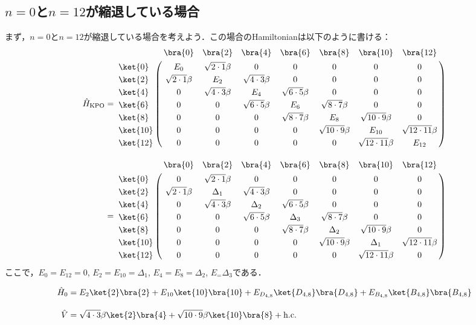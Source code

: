 \subsection{$n=0$と$n=12$が縮退している場合}
まず，$n=0$と$n=12$が縮退している場合を考えよう．この場合のHamiltonianは以下のように書ける：
\begin{align}
     \hat{H}_{\rm{KPO}}&=
   \bordermatrix{     
    & \bra{0} &  \bra{2} &  \bra{4}&  \bra{6}&  \bra{8} &\bra{10} &\bra{12}\cr
   \ket{0}&E_0&\sqrt{2\cdot1}\beta&0&0&0&0&0\cr
  \ket{2}&\sqrt{2\cdot1}\beta&E_2&\sqrt{4\cdot3}\beta&0&0&0&0\cr
  \ket{4}&0&\sqrt{4\cdot3}\beta&E_4&\sqrt{6\cdot5}\beta&0&0&0\cr
  \ket{6}&0&0&\sqrt{6\cdot5}\beta&E_6&\sqrt{8\cdot7}\beta&0&0\cr
  \ket{8}&0&0&0&\sqrt{8\cdot7}\beta&E_8&\sqrt{10\cdot9}\beta&0\cr
  \ket{10}&0&0&0&0&\sqrt{10\cdot9}\beta&E_{10}&\sqrt{12\cdot11}\beta\cr
  \ket{12}&0&0&0&0&0&\sqrt{12\cdot11}\beta&E_{12}\cr
            }\\[10pt]
    &=
   \bordermatrix{     
    & \bra{0} &  \bra{2} &  \bra{4}&  \bra{6}&  \bra{8} &\bra{10} &\bra{12}\cr
   \ket{0}&0&\sqrt{2\cdot1}\beta&0&0&0&0&0\cr
  \ket{2}&\sqrt{2\cdot1}\beta&\Delta_1&\sqrt{4\cdot3}\beta&0&0&0&0\cr
  \ket{4}&0&\sqrt{4\cdot3}\beta&\Delta_2&\sqrt{6\cdot5}\beta&0&0&0\cr
  \ket{6}&0&0&\sqrt{6\cdot5}\beta&\Delta_3&\sqrt{8\cdot7}\beta&0&0\cr
  \ket{8}&0&0&0&\sqrt{8\cdot7}\beta&\Delta_2&\sqrt{10\cdot9}\beta&0\cr
  \ket{10}&0&0&0&0&\sqrt{10\cdot9}\beta&\Delta_1&\sqrt{12\cdot11}\beta\cr
  \ket{12}&0&0&0&0&0&\sqrt{12\cdot11}\beta&0\cr
            }
\end{align}
ここで，$E_0=E_12=0$, $E_2=E_{10}=\Delta_1$, $E_4=E_{8}=\Delta_2$, $E_=\Delta_3$である．




\begin{align}
    \hat{H}_0 &= E_{2}\ket{2}\bra{2} + E_{10} \ket{10}\bra{10} + E_{D_{4,8}} \ket{D_{4,8}}\bra{D_{4,8}}+ E_{B_{4,8}} \ket{B_{4,8}}\bra{B_{4,8}}\\[10pt]
    \hat{V}&= \sqrt{4\cdot3}\beta\ket{2}\bra{4} + \sqrt{10\cdot9}\beta\ket{10}\bra{8} + {\rm{h.c.}}
\end{align}


